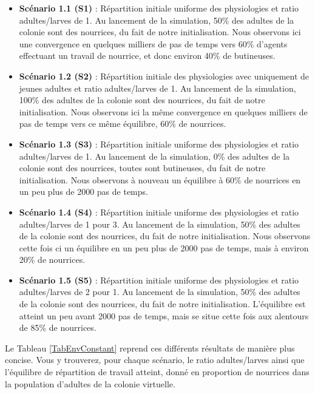 	\begin{itemize}
		\item \textbf{Scénario 1.1 (S1)} : Répartition initiale uniforme des physiologies et ratio adultes/larves de 1. Au lancement de la simulation, 50\% des adultes de la colonie sont des nourrices, du fait de notre initialisation. Nous observons ici une convergence en quelques milliers de pas de temps vers 60\% d'agents effectuant un travail de nourrice, et donc environ 40\% de butineuses.
		
		\item \textbf{Scénario 1.2 (S2)} : Répartition initiale des physiologies avec uniquement de jeunes adultes et ratio adultes/larves de 1. Au lancement de la simulation, 100\% des adultes de la colonie sont des nourrices, du fait de notre initialisation. Nous observons ici la même convergence en quelques milliers de pas de temps vers ce même équilibre, 60\% de nourrices.
		
		\item \textbf{Scénario 1.3 (S3)} : Répartition initiale uniforme des physiologies et ratio adultes/larves de 1. Au lancement de la simulation, 0\% des adultes de la colonie sont des nourrices, toutes sont butineuses, du fait de notre initialisation. Nous observons à nouveau un équilibre à 60\% de nourrices en un peu plus de 2000 pas de temps.
		
		\item \textbf{Scénario 1.4 (S4)} : Répartition initiale uniforme des physiologies et ratio adultes/larves de 1 pour 3. Au lancement de la simulation, 50\% des adultes de la colonie sont des nourrices, du fait de notre initialisation. Nous observons cette fois ci un équilibre en un peu plus de 2000 pas de temps, mais à environ 20\% de nourrices.
		
		\item \textbf{Scénario 1.5 (S5)} : Répartition initiale uniforme des physiologies et ratio adultes/larves de 2 pour 1. Au lancement de la simulation, 50\% des adultes de la colonie sont des nourrices, du fait de notre initialisation. L'équilibre est atteint un peu avant 2000 pas de temps, mais se situe cette fois aux alentours de 85\% de nourrices.		
	\end{itemize}
	
	Le Tableau \ref{TabEnvConstant} reprend ces différents résultats de manière plus concise. Vous y trouverez, pour chaque scénario, le ratio adultes/larves ainsi que l'équilibre de répartition de travail atteint, donné en proportion de nourrices dans la population d'adultes de la colonie virtuelle.
	
